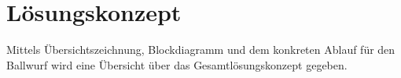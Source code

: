 \section{Lösungskonzept} 

Mittels Übersichtszeichnung, Blockdiagramm und dem konkreten Ablauf für den Ballwurf wird eine Übersicht über das Gesamtlösungskonzept gegeben.


\newpage

\newpage

\newpage

\newpage